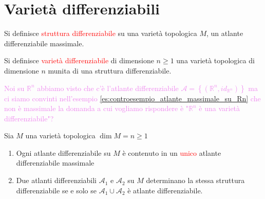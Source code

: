     \section{Varietà differenziabili}
        \begin{definizione}
        \mbox{}

        Si definisce \textcolor{red}{struttura differenziabile} su una varietà topologica $M$, un atlante differenziabile massimale.

        Si definisce \textcolor{red}{varietà differenziabile} di dimensione $n \geq 1$ una varietà topologica di dimensione $n$ munita di una struttura differenziabile.
        \end{definizione}
        \textcolor{violet}{Noi su $\mathbb{R}^n$ abbiamo visto che c'è l'atlante differenziabile $\mathcal{A}=\left\{  \left( \mathbb{R}^n, id_{\mathbb{R}^n}\right) \right\}$ ma 
        ci siamo convinti nell'esempio \ref{es:controesempio_atlante_massimale_su_Rn} che non è massimale la domanda a cui vogliamo rispondere è "$\mathbb{R}^n$ è una varietà differenziabile"?}
        \begin{teorema}
        \label{th:esistenza_di_atlanti_massimali}
        \mbox{}

        Sia $M$ una varietà topologica $\dim M = n \geq 1$
        \begin{enumerate}
            \item Ogni atlante differenziabile su $M$ è contenuto in un \textcolor{red}{unico} atlante differenziabile massimale
            \item Due atlanti differenziabili $\mathcal{A}_1$ e $\mathcal{A}_2$ su $M$ determinano la stessa struttura differenziabile
            se e solo se $\mathcal{A}_1 \cup \mathcal{A}_2$ è atlante differenziabile. 
        \end{enumerate}
        \end{teorema}
